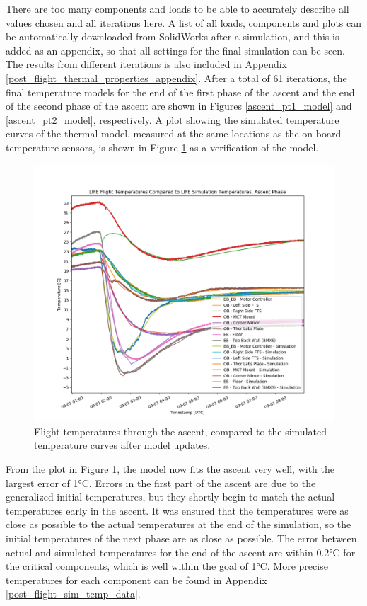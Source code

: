 There are too many components and loads to be able to accurately describe all values chosen and all iterations here. A list of all loads, components and plots can be automatically downloaded from SolidWorks after a simulation, and this is added as an appendix, so that all settings for the final simulation can be seen. The results from different iterations is also included in Appendix \ref{post_flight_thermal_properties_appendix}. After a total of 61 iterations, the final temperature models for the end of the first phase of the ascent and the end of the second phase of the ascent are shown in Figures \ref{ascent_pt1_model} and \ref{ascent_pt2_model}, respectively. A plot showing the simulated temperature curves of the thermal model, measured at the same locations as the on-board temperature sensors, is shown in Figure \ref{fig:ascent_temps_with_sims} as a verification of the model.

\begin{figure}
    \centering
    \includegraphics[width=\textwidth]{chap4_images/ascent_images/ascent_with_sim_temps_no_altitude.png}
    \caption{Flight temperatures through the ascent, compared to the simulated temperature curves after model updates.}
    \label{fig:ascent_temps_with_sims}
\end{figure}

From the plot in Figure \ref{fig:ascent_temps_with_sims}, the model now fits the ascent very well, with the largest error of 1°C. Errors in the first part of the ascent are due to the generalized initial temperatures, but they shortly begin to match the actual temperatures early in the ascent. It was ensured that the temperatures were as close as possible to the actual temperatures at the end of the simulation, so the initial temperatures of the next phase are as close as possible. The error between actual and simulated temperatures for the end of the ascent are within 0.2°C for the critical components, which is well within the goal of 1°C. More precise temperatures for each component can be found in Appendix \ref{post_flight_sim_temp_data}.

